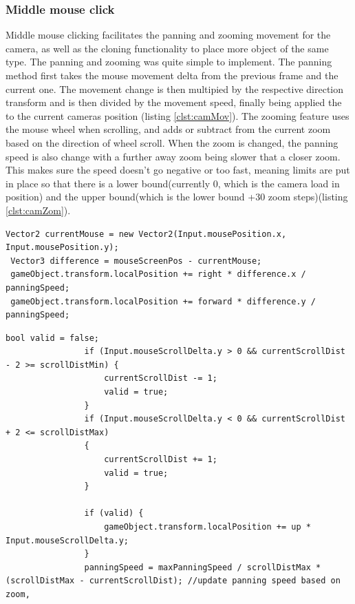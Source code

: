\subsubsection{Middle mouse click}
Middle mouse clicking facilitates the panning and zooming movement for the camera, as well as the cloning functionality to place more object of the same type. The panning and zooming was quite simple to implement. The panning method first takes the mouse movement delta from the previous frame and the current one. The movement change is then multipied by the respective direction transform and is then divided by the movement speed, finally being applied the to the current cameras position (listing \ref{clst:camMov}). The zooming feature uses the mouse wheel when scrolling, and adds or subtract from the current zoom based on the direction of wheel scroll. When the zoom is changed, the panning speed is also change with a further away zoom being slower that a closer zoom. This makes sure the speed doesn't go negative or too fast, meaning limits are put in place so that there is a lower bound(currently 0, which is the camera load in position) and the upper bound(which is the lower bound +30 zoom steps)(listing \ref{clst:camZom}).
\begin{lstlisting}[language={[Sharp]C}, caption=Camera movement code, label=clst:camMov]
Vector2 currentMouse = new Vector2(Input.mousePosition.x, Input.mousePosition.y);
 Vector3 difference = mouseScreenPos - currentMouse;
 gameObject.transform.localPosition += right * difference.x / panningSpeed;
 gameObject.transform.localPosition += forward * difference.y / panningSpeed;
\end{lstlisting}
\begin{lstlisting}[language={[Sharp]C}, caption=Camer zooming code, label=clst:camZom]
 bool valid = false;
                if (Input.mouseScrollDelta.y > 0 && currentScrollDist - 2 >= scrollDistMin) {
                    currentScrollDist -= 1;
                    valid = true;
                }
                if (Input.mouseScrollDelta.y < 0 && currentScrollDist + 2 <= scrollDistMax)
                {
                    currentScrollDist += 1;
                    valid = true;
                }

                if (valid) {
                    gameObject.transform.localPosition += up * Input.mouseScrollDelta.y;
                }
                panningSpeed = maxPanningSpeed / scrollDistMax * (scrollDistMax - currentScrollDist); //update panning speed based on zoom,
\end{lstlisting}

